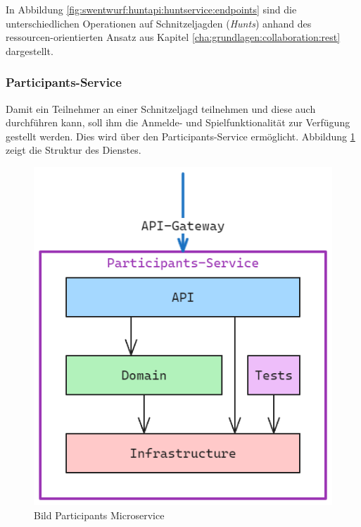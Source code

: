 In Abbildung \ref{fig:swentwurf:huntapi:huntservice:endpoints} sind die unterschiedlichen Operationen auf Schnitzeljagden (\textit{Hunts}) anhand des ressourcen-orientierten Ansatz aus Kapitel \ref{cha:grundlagen:collaboration:rest} dargestellt.

\subsubsection{Participants-Service}

Damit ein Teilnehmer an einer Schnitzeljagd teilnehmen und diese auch durchführen kann, soll ihm die Anmelde- und Spielfunktionalität zur Verfügung gestellt werden. Dies wird über den Participants-Service ermöglicht. Abbildung \ref{fig:swentwurf:huntapi:participantservice} zeigt die Struktur des Dienstes.

\begin{figure}[H]
    \centering
    \includegraphics[width=\textwidth]{images/PrAr-Software-Entwurf-Hunt-Api-Participant-Service.png}
    \caption{Bild Participants Microservice}
    \label{fig:swentwurf:huntapi:participantservice}
\end{figure}

